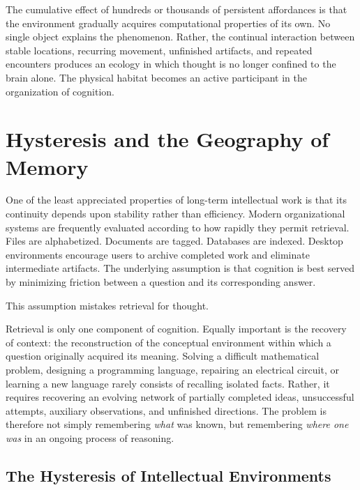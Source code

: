 \documentclass[12pt,oneside]{article}
\theoremstyle{remark}
\begin{document}
The cumulative effect of hundreds or thousands of persistent affordances is that the environment gradually acquires computational properties of its own. No single object explains the phenomenon. Rather, the continual interaction between stable locations, recurring movement, unfinished artifacts, and repeated encounters produces an ecology in which thought is no longer confined to the brain alone. The physical habitat becomes an active participant in the organization of cognition.


\section{Hysteresis and the Geography of Memory}

One of the least appreciated properties of long-term intellectual work is that its continuity depends upon stability rather than efficiency. Modern organizational systems are frequently evaluated according to how rapidly they permit retrieval. Files are alphabetized. Documents are tagged. Databases are indexed. Desktop environments encourage users to archive completed work and eliminate intermediate artifacts. The underlying assumption is that cognition is best served by minimizing friction between a question and its corresponding answer.

This assumption mistakes retrieval for thought.

Retrieval is only one component of cognition. Equally important is the recovery of context: the reconstruction of the conceptual environment within which a question originally acquired its meaning. Solving a difficult mathematical problem, designing a programming language, repairing an electrical circuit, or learning a new language rarely consists of recalling isolated facts. Rather, it requires recovering an evolving network of partially completed ideas, unsuccessful attempts, auxiliary observations, and unfinished directions. The problem is therefore not simply remembering \emph{what} was known, but remembering \emph{where one was} in an ongoing process of reasoning.

\subsection{The Hysteresis of Intellectual Environments}
\end{document}
